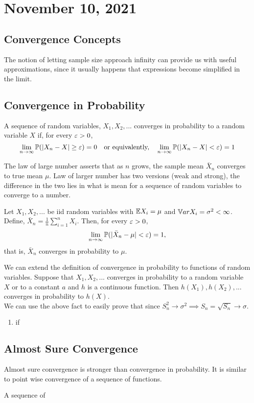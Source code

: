 \section{November 10, 2021}
\subsection{Convergence Concepts}
The notion of letting sample size approach infinity can provide us with useful approximations, since it usually happens that expressions become simplified in the limit. 
\\
\subsection{Convergence in Probability}
\begin{definition}
    A sequence of random variables, $X_1,X_2,...$ converges in probability to a random variable $X$ if, for every $\varepsilon > 0$,
    $$
    \lim_{n \to \infty}\mathbb P(|X_n -X| \geq \varepsilon) = 0  \quad \text{or equivalently,} \quad  \lim_{n \to \infty}\mathbb P(|X_n -X| < \varepsilon) = 1
    $$
\end{definition}
The law of large number asserts that as $n$ grows, the sample mean $\bar{X}_n$ converges to true mean $\mu$. Law of larger number has two versions (weak and strong), the difference in the two lies in what is mean for a sequence of random variables to converge to a number. 

\begin{theorem}
    Let $X_1,X_2,...$ be iid random variables with $\mathbb E X_i = \mu$ and $\mathbb V ar X_i = \sigma^2 < \infty$. Define, $\bar{X}_n = \frac{1}{n}\sum_{i=1}^{n}X_i$. Then, for every $\varepsilon > 0$,
    $$
    \lim_{n \to \infty} \mathbb P(|\bar{X}_n - \mu| < \varepsilon ) = 1,
    $$
    that is, $\bar{X}_n$ converges in probability to $\mu$.
\end{theorem}
We can extend the definition of convergence in probability to functions of random variables. Suppose that $X_1,X_2,...$ converges in probability to a random variable $X$ or to a constant $a$ and $h$ is a continuous function. Then $h(X_1), h(X_2),...$ converges in probability to $h(X)$.
\\
We can use the above fact to easily prove that since $S_n^2 \to \sigma^2 \implies S_n = \sqrt{S_n} \to \sigma$.
\begin{note}
    \begin{enumerate}
        \item if 
    \end{enumerate}
\end{note}
\subsection{Almost Sure Convergence}
Almost sure convergence is stronger than convergence in probability. It is similar to point wise convergence of a sequence of functions.
\begin{definition}
    A sequence of 
\end{definition}